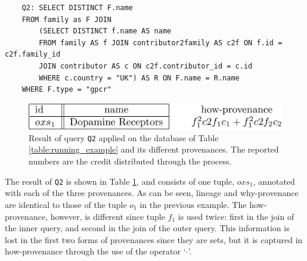 \documentclass[preprint,12pt,sort&compress]{elsarticle}
\begin{document}
\vspace{2mm}
{\footnotesize
\begin{adjustwidth}{25pt}{5pt}
\begin{verbatim}
	Q2: SELECT DISTINCT F.name 
	FROM family as F JOIN
		(SELECT DISTINCT f.name AS name
		FROM family AS f JOIN contributor2family AS c2f ON f.id = c2f.family_id
		JOIN contributor AS c ON c2f.contributor_id = c.id
		WHERE c.country = "UK") AS R ON F.name = R.name
	WHERE F.type = "gpcr"
\end{verbatim}	
\end{adjustwidth}
}
\vspace{2mm}

\begin{figure}[]
\centering
  \includegraphics[width=.8\textwidth]{figures/how_second_example.pdf}
  \caption{Result of query \texttt{Q2} applied on the database of Table \ref{table:running_example} and its different provenances. The reported numbers are the credit distributed through the process.}
  \label{table:difference_result}
\end{figure}


The result of \texttt{Q2} is shown in Table \ref{table:difference_result}, and consists of one tuple, $oxs_1$, annotated with each of the three provenances. As can be seen, lineage and why-provenance are identical to those of the tuple $o_1$ in the previous example. 
The how-provenance, however, is different since tuple $f_1$ is used twice: first in the join of the inner query, and second in the join of the outer query. This information is lost in the first two forms of provenances since they are sets, but it is captured in how-provenance through the use of the operator `$\cdot$'.
\end{document}
